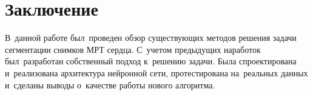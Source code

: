 \section{Заключение}

В~данной работе был~проведен обзор существующих методов решения 
задачи сегментации снимков МРТ сердца. С~учетом предыдущих
наработок был~разработан собственный подход к~решению задачи. 
Была спроектирована и~реализована архитектура нейронной сети, 
протестирована на~реальных данных и~сделаны выводы о~качестве
работы нового алгоритма.


